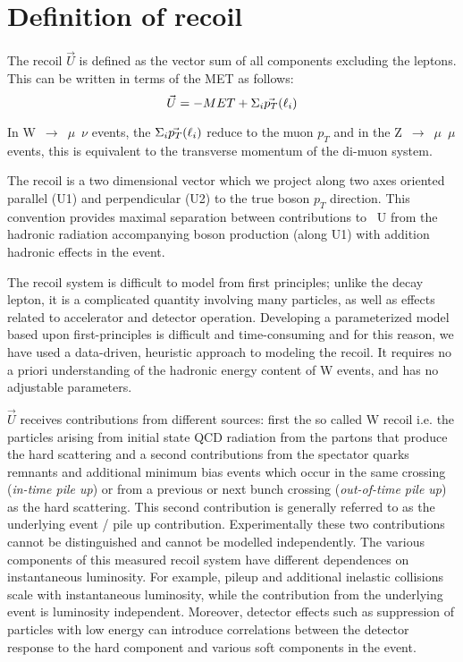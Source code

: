 \section{Definition of recoil}
\label{sec:defRecoil}

The recoil $\vec{U}$ is defined as the vector sum of all components excluding the leptons.
This can be written in terms of the MET as follows:
\begin{equation}
\vec{U}  = - MET +  \Sigma_{i} \space\vec{p_{T}} (\ell_{i}) 
\end{equation}

In W~$\rightarrow$~$\mu$~$\nu$ events, the $\Sigma_{i} \space\vec{p_{T}} (\ell_{i}) $ reduce to the muon $p_{T}$ and in the Z~$\rightarrow$~$\mu$~$\mu$
events, this is equivalent to the transverse momentum of the di-muon system.

The recoil is a two dimensional vector which we project along two axes oriented parallel
(U1) and perpendicular (U2) to the true boson $p_{T}$ direction.
This convention provides maximal separation between contributions to ~U
from the hadronic radiation accompanying boson production (along U1) with addition hadronic effects in the
event.

The recoil system is difficult to model from first principles; unlike the decay lepton, it is a complicated
quantity involving many particles, as well as effects related to accelerator and detector operation.
Developing a parameterized model based upon first-principles is difficult and time-consuming and for this reason,
we have used a data-driven, heuristic approach to modeling the recoil.
It requires no a priori understanding of the hadronic energy content of W events, and has no adjustable parameters.

$\vec{U}$ receives contributions from different sources: first the so called W recoil i.e. the particles arising from initial state QCD radiation from the partons that produce the hard scattering and a second contributions from the spectator quarks remnants and additional minimum bias events which occur in the same crossing ({\it in-time pile up}) or from a previous or next bunch crossing ({\it out-of-time pile up}) as the hard scattering. 
This second contribution is generally referred to as the underlying event / pile up contribution. 
Experimentally these two contributions cannot be distinguished and cannot be modelled independently.
The various components of this measured recoil system have different dependences on instantaneous
luminosity. For example, pileup and additional inelastic collisions scale with instantaneous luminosity, while
the contribution from the underlying event is luminosity independent. Moreover, detector effects such
as suppression of particles with low energy can introduce correlations between the detector response to the hard component 
and various soft components in the event.


